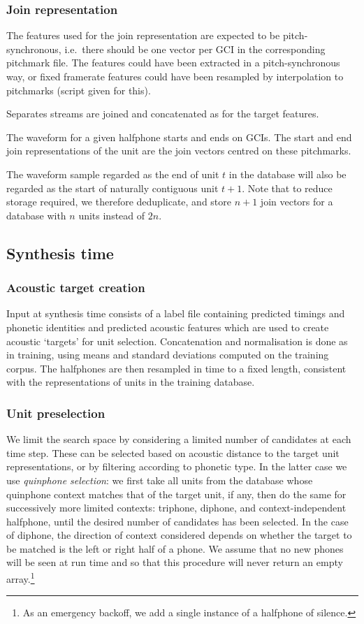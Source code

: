 \subsubsection{Join representation}

The features used for the join representation are expected to be pitch-synchronous, i.e.\ there should be one vector per GCI in the corresponding pitchmark file. The features could have been extracted in a pitch-synchronous way, or fixed framerate features could have been resampled by interpolation to pitchmarks (script given for this).

Separates streams are joined and concatenated as for the target features. 

The waveform for a given halfphone starts and ends on GCIs. The start and end join representations of the unit are the join vectors centred on these pitchmarks.

The waveform sample regarded as the end of unit $t$ in the database will also be regarded as the start of naturally contiguous unit $t+1$.  Note that to reduce storage required, we therefore deduplicate, and store $n+1$ join  vectors for a database with $n$ units instead of $2n$. 


\subsection{Synthesis time}

\subsubsection{Acoustic target creation}
Input at synthesis time consists of a label file containing predicted timings and phonetic identities and predicted acoustic features which are used to create acoustic `targets' for unit selection.
Concatenation and normalisation is done as in training, using means and standard deviations computed on the training corpus. The halfphones are then resampled in time to a fixed length, consistent with the representations of units in the training database.

\subsubsection{Unit preselection}
We limit the search space by considering a limited number of candidates at each time step.
These can be selected based on acoustic distance to the target unit representations, or by filtering according to phonetic type. 
In the latter case we use \textit{quinphone selection}: we first take all units from the database whose quinphone context matches that of the target unit, if any, then do the same for successively more limited contexts: triphone, diphone, and context-independent halfphone, until the desired number of candidates has been selected. In the case of diphone, the direction of context considered depends on whether the target to be matched is the left or right half of a phone. We assume that no new phones will be seen at run time and so that this procedure will never return an empty array.\footnote{As an emergency backoff, we add a single instance of a halfphone of silence.}

